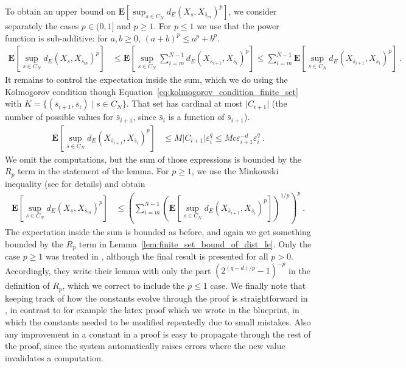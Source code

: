 \documentclass[lean]{Draft}
\begin{document}
To obtain an upper bound on $\mathbf{E}\left[\sup_{s \in C_N} d_E(X_s, X_{\bar{s}_m})^p\right]$, we consider separately the cases $p \in (0, 1]$ and $p \ge 1$.
For $p \le 1$ we use that the power function is sub-additive: for $a, b \ge 0$, $(a + b)^p \le a^p + b^p$.
\begin{align*}
  \mathbf{E}\left[\sup_{s \in C_N} d_E(X_s, X_{\bar{s}_m})^p\right]
  &\le \mathbf{E}\left[\sup_{s \in C_N} \sum_{i=m}^{N-1} d_E(X_{\bar{s}_{i+1}}, X_{\bar{s}_i})^p\right]
  \le \sum_{i=m}^{N-1} \mathbf{E}\left[\sup_{s \in C_N} d_E(X_{\bar{s}_{i+1}}, X_{\bar{s}_i})^p\right]
  \: .
\end{align*}
It remains to control the expectation inside the sum, which we do using the Kolmogorov condition though Equation~\eqref{eq:kolmogorov_condition_finite_set} with $K = \{(\bar{s}_{i+1}, \bar{s}_i) \mid s \in C_N\}$. That set has cardinal at most $\lvert C_{i+1} \rvert$ (the number of possible values for $\bar{s}_{i+1}$, since $\bar{s}_i$ is a function of $\bar{s}_{i+1}$).
\begin{align*}
  \mathbf{E}\left[\sup_{s \in C_N} d_E(X_{\bar{s}_{i+1}}, X_{\bar{s}_i})^p\right]
  &\le M \lvert C_{i+1} \rvert \varepsilon_i^q
  \le M c \varepsilon_{i+1}^{-d} \varepsilon_i^{q}
  \: .
\end{align*}
We omit the computations, but the sum of those expressions is bounded by the $R_p$ term in the statement of the lemma.
For $p \ge 1$, we use the Minkowski inequality (see \cite{kratschmer2023kolmogorov} for details) and obtain
\begin{align*}
  \mathbf{E}\left[\sup_{s \in C_N} d_E(X_s, X_{\bar{s}_m})^p\right]
  &\le \left( \sum_{i=m}^{N-1} \left( \mathbf{E}\left[\sup_{s \in C_N} d_E(X_{\bar{s}_{i+1}}, X_{\bar{s}_i})^p\right] \right)^{1/p} \right)^p
  \: .
\end{align*}
The expectation inside the sum is bounded as before, and again we get something bounded by the $R_p$ term in Lemma~\ref{lem:finite_set_bound_of_dist_le}.
Only the case $p \ge 1$ was treated in \cite{kratschmer2023kolmogorov}, although the final result is presented for all $p > 0$.
Accordingly, they write their lemma with only the part $(2^{(q-d)/p} - 1)^{-p}$ in the definition of $R_p$, which we correct to include the $p \le 1$ case.
We finally note that keeping track of how the constants evolve through the proof is straightforward in \Lean, in contrast to for example the latex proof which we wrote in the blueprint, in which the constants needed to be modified repeatedly due to small mistakes.
Also any improvement in a constant in a \Lean proof is easy to propagate through the rest of the proof, since the system automatically raises errors where the new value invalidates a computation.
\end{document}
